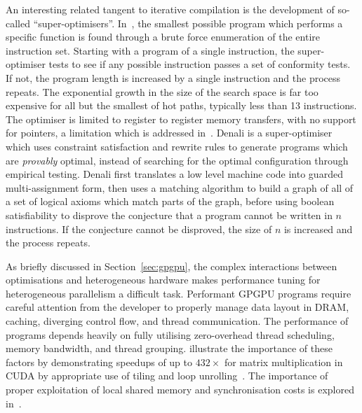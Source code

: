 An interesting related tangent to iterative compilation is the
development of so-called ``super-optimisers''. In~\cite{Massalin1987},
the smallest possible program which performs a specific function is
found through a brute force enumeration of the entire instruction
set. Starting with a program of a single instruction, the
super-optimiser tests to see if any possible instruction passes a set
of conformity tests. If not, the program length is increased by a
single instruction and the process repeats. The exponential growth in
the size of the search space is far too expensive for all but the
smallest of hot paths, typically less than 13 instructions. The
optimiser is limited to register to register memory transfers, with no
support for pointers, a limitation which is addressed
in~\cite{Joshi2002}. Denali is a super-optimiser which uses constraint
satisfaction and rewrite rules to generate programs which are
\emph{provably} optimal, instead of searching for the optimal
configuration through empirical testing. Denali first translates a low
level machine code into guarded multi-assignment form, then uses a
matching algorithm to build a graph of all of a set of logical axioms
which match parts of the graph, before using boolean satisfiability to
disprove the conjecture that a program cannot be written in $n$
instructions. If the conjecture cannot be disproved, the size of $n$
is increased and the process repeats.



As briefly discussed in Section~\ref{sec:gpgpu}, the complex
interactions between optimisations and heterogeneous hardware makes
performance tuning for heterogeneous parallelism a difficult
task. Performant GPGPU programs require careful attention from the
developer to properly manage data layout in DRAM, caching, diverging
control flow, and thread communication. The performance of programs
depends heavily on fully utilising zero-overhead thread scheduling,
memory bandwidth, and thread grouping. \citeauthor{Ryoo2008a}
illustrate the importance of these factors by demonstrating speedups
of up to $432\times$ for matrix multiplication in CUDA by appropriate
use of tiling and loop unrolling~\cite{Ryoo2008a}. The importance of
proper exploitation of local shared memory and synchronisation costs
is explored in~\cite{Lee2010}.


